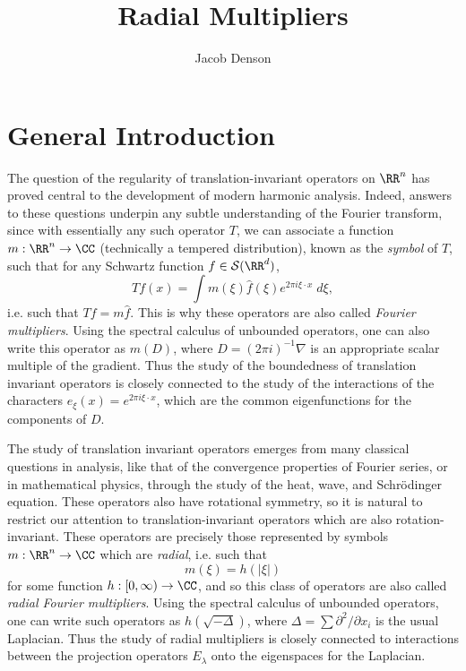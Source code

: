 

\title{Radial Multipliers}
\author{Jacob Denson}



\maketitle

\tableofcontents

\newpage

\chapter{General Introduction}

The question of the regularity of translation-invariant operators on $\RR^n$ has proved central to the development of modern harmonic analysis. Indeed, answers to these questions underpin any subtle understanding of the Fourier transform, since with essentially any such operator $T$, we can associate a function $m: \RR^n \to \CC$ (technically a tempered distribution), known as the \emph{symbol} of $T$, such that for any Schwartz function $f \in \mathcal{S}(\RR^d)$,
%
\[ Tf(x) = \int m(\xi) \widehat{f}(\xi) e^{2 \pi i \xi \cdot x}\; d\xi, \]
%
i.e. such that $\widehat{Tf} = m \widehat{f}$. This is why these operators are also called \emph{Fourier multipliers}. Using the spectral calculus of unbounded operators, one can also write this operator as $m(D)$, where $D = (2 \pi i)^{-1} \nabla$ is an appropriate scalar multiple of the gradient. Thus the study of the boundedness of translation invariant operators is closely connected to the study of the interactions of the characters $e_\xi(x) = e^{2 \pi i \xi \cdot x}$, which are the common eigenfunctions for the components of $D$.

The study of translation invariant operators emerges from many classical questions in analysis, like that of the convergence properties of Fourier series, or in mathematical physics, through the study of the heat, wave, and Schr\"{o}dinger equation. These operators also have rotational symmetry, so it is natural to restrict our attention to translation-invariant operators which are also rotation-invariant. These operators are precisely those represented by symbols $m: \RR^n \to \CC$ which are \emph{radial}, i.e. such that
%
\[ m(\xi) = h(|\xi|) \]
%
for some function $h: [0,\infty) \to \CC$, and so this class of operators are also called \emph{radial Fourier multipliers}. Using the spectral calculus of unbounded operators, one can write such operators as $h(\sqrt{-\Delta})$, where $\Delta = \sum \partial^2 / \partial x_i$ is the usual Laplacian. Thus the study of radial multipliers is closely connected to interactions between the projection operators $E_\lambda$ onto the eigenspaces for the Laplacian.


